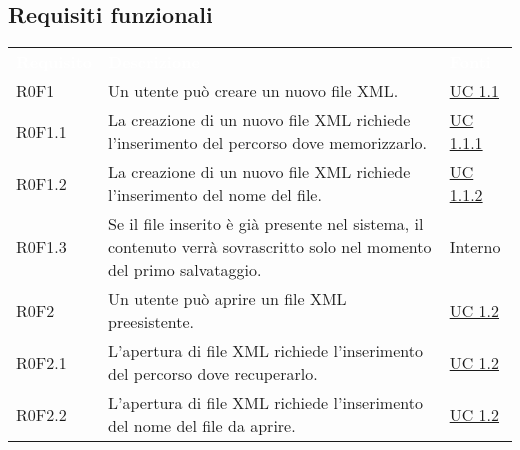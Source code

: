 \subsection{Requisiti funzionali}
\begin{center}
	\begin{longtable}{p{4.2cm}!{\color{white}\vrule width 0.5mm}p{6cm}!{\color{white}\vrule width 0.5mm}p{2.5cm}!{\color{white}\vrule width 0.5mm}}
		\textcolor{white}{\textbf{Requisito}}&\textcolor{white}{\textbf{Descrizione}}&\textcolor{white}{\textbf{Fonti}}\\
		
		\hspace{0mm}\hypertarget{XER0F1}{R0F1} & Un utente può creare un nuovo file XML. & \hyperref[subsec:XEUC1.1]{UC 1.1}\\
		
			\hspace{2mm}\hypertarget{XER0F1.1}{R0F1.1} & La creazione di un nuovo file XML richiede l'inserimento del percorso dove memorizzarlo. & \hyperref[subsec:XEUC1.1.1]{UC 1.1.1}\\
		
			\hspace{2mm}\hypertarget{XER0F1.2}{R0F1.2} & La creazione di un nuovo file XML richiede l'inserimento del nome del file. & \hyperref[subsec:XEUC1.1.2]{UC 1.1.2}\\
			
			
			\hspace{2mm}\hypertarget{XER0F1.3}{R0F1.3} & Se il file inserito è già presente nel sistema, il contenuto verrà sovrascritto solo nel momento del primo salvataggio. & Interno\\
			
		
		\hspace{0mm}\hypertarget{XER0F2}{R0F2} & Un utente può aprire un file XML preesistente. & \hyperref[subsec:XEUC1.2]{UC 1.2}\\
		
			\hspace{2mm}\hypertarget{XER0F2.1}{R0F2.1} & L'apertura di file XML richiede l'inserimento del percorso dove recuperarlo. & \hyperref[subsec:XEUC1.2]{UC 1.2}\\
		
			\hspace{2mm}\hypertarget{R0F2.2}{R0F2.2} & L'apertura di file XML richiede l'inserimento del nome del file da aprire. & \hyperref[subsec:XEUC1.2]{UC 1.2}\\
		

\end{longtable}
\end{center}
